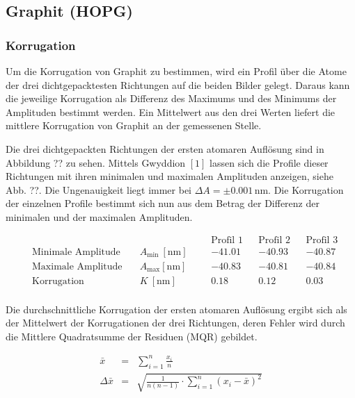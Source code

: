 \documentclass[12pt,a4paper]{scrartcl}
\numberwithin{equation}{section} %
\begin{document}
\hypertarget{graphit-hopg}{%
\subsection{Graphit (HOPG)}\label{graphit-hopg}}

\hypertarget{korrugation}{%
\subsubsection{Korrugation}\label{korrugation}}

Um die Korrugation von Graphit zu bestimmen, wird ein Profil über die
Atome der drei dichtgepacktesten Richtungen auf die beiden Bilder
gelegt. Daraus kann die jeweilige Korrugation als Differenz des Maximums
und des Minimums der Amplituden bestimmt werden. Ein Mittelwert aus den
drei Werten liefert die mittlere Korrugation von Graphit an der
gemessenen Stelle.

Die drei dichtgepackten Richtungen der ersten atomaren Auflösung sind in
Abbildung ?? zu sehen. Mittels Gwyddion $[1]$ lassen sich die Profile
dieser Richtungen mit ihren minimalen und maximalen Amplituden anzeigen,
siehe Abb. ??. Die Ungenauigkeit liegt immer bei
$\Delta A = \pm 0.001 \mathrm{\,nm}$. Die Korrugation der einzelnen
Profile bestimmt sich nun aus dem Betrag der Differenz der minimalen und
der maximalen Amplituden.

\begin{align*}
    &&&&& \text{Profil 1}&& \text{Profil 2} && \text{Profil 3} \\
    &\text{Minimale Amplitude}\quad &A_\mathrm{min}\ [\mathrm{nm}] &&
        & -41.01 && -40.93 && -40.87 \\
    &\text{Maximale Amplitude}\quad &A_\mathrm{max} [\mathrm{nm}] &&
        & -40.83 && -40.81 && -40.84 \\
    &\text{Korrugation} &K\ [\mathrm{nm}] &&
        & 0.18 && 0.12 && 0.03 \\
\end{align*}

Die durchschnittliche Korrugation der ersten atomaren Auflösung ergibt
sich als der Mittelwert der Korrugationen der drei Richtungen, deren
Fehler wird durch die Mittlere Quadratsumme der Residuen (MQR) gebildet.

\begin{eqnarray}
    \bar{x} &=& \sum_{i=1}^n \frac{x_i}{n} \\
    \Delta \bar{x} &=& \sqrt{\frac{1}{n (n-1)} \cdot \sum_{i=1}^{n} (x_i -\bar{x})^2}
\end{eqnarray}
\end{document}
